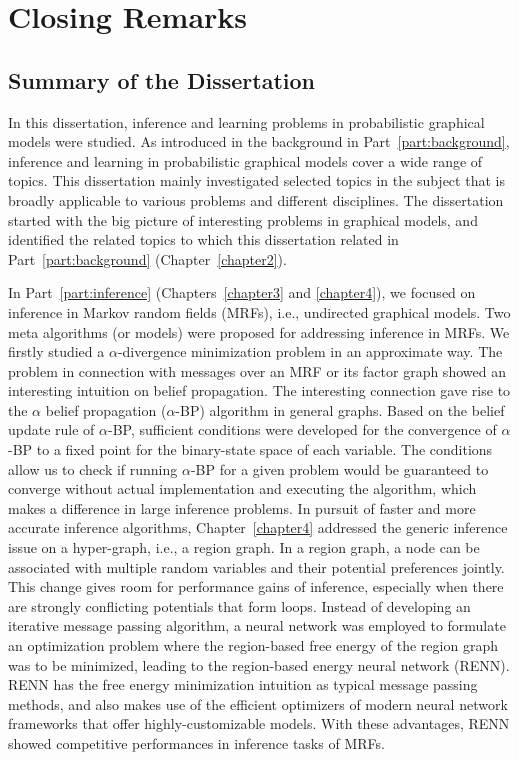 \chapter{Closing Remarks}
\label{chapter9}

\section{Summary of the Dissertation}
In this dissertation, inference and learning problems in probabilistic graphical models were studied. As introduced in the background in Part~\ref{part:background}, inference and learning in probabilistic graphical models cover a wide range of topics. This dissertation mainly investigated selected topics in the subject that is broadly applicable to various problems and different disciplines. The dissertation started with the big picture of interesting problems in graphical models, and identified the related topics to which this dissertation related in Part~\ref{part:background} (Chapter~\ref{chapter2}).

In Part~\ref{part:inference} (Chapters~\ref{chapter3} and \ref{chapter4}), we focused on inference in Markov random fields (MRFs), i.e., undirected graphical models. Two meta algorithms (or models) were proposed for addressing inference in MRFs. We firstly studied a $\alpha$-divergence minimization problem in an approximate way. The problem in connection with messages over an MRF or its factor graph showed an interesting intuition on belief propagation. The interesting connection gave rise to the $\alpha$ belief propagation ($\alpha$-BP) algorithm in general graphs. Based on the belief update rule of $\alpha$-BP, sufficient conditions were developed for the convergence of $\alpha$-BP to a fixed point for the binary-state space of each variable. The conditions allow us to check if running $\alpha$-BP for a given problem would be guaranteed to converge without actual implementation and executing the algorithm, which makes a difference in large inference problems. In pursuit of faster and more accurate inference algorithms, Chapter~\ref{chapter4} addressed the generic inference issue on a hyper-graph, i.e., a region graph. In a region graph, a node can be associated with multiple random variables and their potential preferences jointly. This change gives room for performance gains of inference, especially when there are strongly conflicting potentials that form loops. Instead of developing an iterative message passing algorithm, a neural network was employed to formulate an optimization problem where the region-based free energy of the region graph was to be minimized, leading to the region-based energy neural network (RENN). RENN has the free energy minimization intuition as typical message passing methods, and also makes use of the efficient optimizers of modern neural network frameworks that offer highly-customizable models. With these advantages, RENN showed competitive performances in inference tasks of MRFs.

